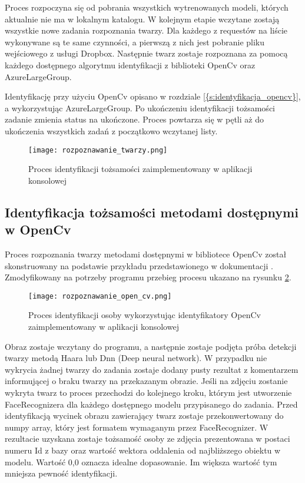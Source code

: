 Proces rozpoczyna się od pobrania wszystkich wytrenowanych modeli, których aktualnie nie ma w lokalnym katalogu. W kolejnym etapie wczytane zostają wszystkie nowe zadania rozpoznania twarzy. Dla każdego z requestów na liście wykonywane są te same czynności, a pierwszą z nich jest pobranie pliku wejściowego z usługi Dropbox. Następnie twarz zostaje rozpoznana za pomocą każdego dostępnego algorytmu identyfikacji z biblioteki OpenCv oraz AzureLargeGroup. 

Identyfikację przy użyciu OpenCv opisano w rozdziale \ref{{s:identyfikacja_opencv}}, a wykorzystując AzureLargeGroup. Po ukończeniu identyfikacji tożsamości zadanie zmienia status na ukończone. Proces powtarza się w pętli aż do ukończenia wszystkich zadań z początkowo wczytanej listy.
\begin{figure}[H]
	\centering
	\texttt{[image: rozpoznawanie\_twarzy.png]}
	\caption{Proces identyfikacji tożsamości zaimplementowany w aplikacji konsolowej}
	\label{fig:rozpoznawanie_proces}
\end{figure}

\subsection{Identyfikacja tożsamości metodami dostępnymi w OpenCv}\label{s:identyfikacja_opencv}
Proces rozpoznania twarzy metodami dostępnymi w bibliotece OpenCv został skonstruowany na podstawie przykładu przedstawionego w dokumentacji \cite{opencv_doc}. Zmodyfikowany na potrzeby programu przebieg procesu ukazano na rysunku \ref{fig:rozpoznawanie_open_cv}.
\begin{figure}[H]
	\centering
	\texttt{[image: rozpoznawanie\_open\_cv.png]}
	\caption{Proces identyfikacji osoby wykorzystując identyfikatory OpenCv zaimplementowany w aplikacji konsolowej}
	\label{fig:rozpoznawanie_open_cv}
\end{figure}
Obraz zostaje wczytany do programu, a następnie zostaje podjęta próba detekcji twarzy metodą Haara lub Dnn (Deep neural network). W przypadku nie wykrycia żadnej twarzy do zadania zostaje dodany pusty rezultat z komentarzem informującej o braku twarzy na przekazanym obrazie. 
Jeśli na zdjęciu zostanie wykryta twarz to proces przechodzi do kolejnego kroku, którym jest utworzenie FaceRecognizera dla każdego dostępnego modelu przypisanego do zadania. Przed identyfikacją wycinek obrazu zawierający twarz zostaje przekonwertowany do numpy array, który jest formatem wymaganym przez FaceRecognizer. W rezultacie uzyskana zostaje tożsamość osoby ze zdjęcia prezentowana w postaci numeru Id z bazy oraz wartość wektora oddalenia od najbliższego obiektu w modelu. Wartość 0,0 oznacza idealne dopasowanie. Im większa wartość tym mniejsza pewność identyfikacji. 


